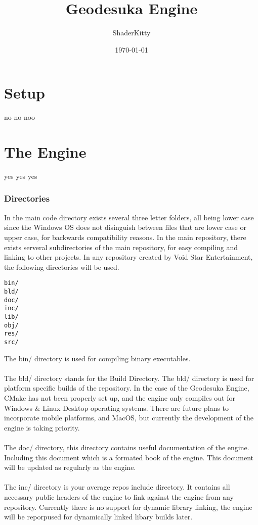 \documentclass{book}
\title{Geodesuka Engine}
\author{ShaderKitty}
\date{\today}
\begin{document}
\maketitle

\frontmatter

\chapter{Setup}
no no noo
\chapter{The Engine}
yes yes yes
\subsection{Directories}
In the main code directory exists several three letter folders, all being lower case since the Windows OS does not disinguish between files
that are lower case or upper case, for backwards compatibility reasons. In the main repository, there exists serveral subdirectories of the main
repository, for easy compiling and linking to other projects. In any repository created by Void Star Entertainment, the following directories will
be used.
\begin{lstlisting}
bin/
bld/
doc/
inc/
lib/
obj/
res/
src/
\end{lstlisting}
The bin/ directory is used for compiling binary executables. \\ \\
The bld/ directory stands for the Build Directory. The bld/ directory is used for platform specific builds of the repository.
In the case of the Geodesuka Engine, CMake has not been properly set up, and the engine only compiles out for Windows \& Linux Desktop operating systems. There are future plans
to incorporate mobile platforms, and MacOS, but currently the development of the engine is taking priority. \\ \\ The doc/ directory, this directory contains useful documentation
of the engine. Including this document which is a formated book of the engine. This document will be updated as regularly as the engine. \\ \\ The inc/ directory is your average repos include directory.
It contains all necessary public headers of the engine to link against the engine from any repository. Currently there is no support for dynamic library linking, the engine will be reporpused for dynamically
linked libary builds later.
\end{document}
